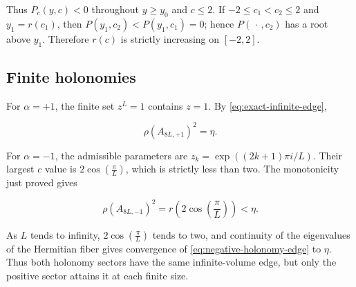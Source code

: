 Thus \(P_c(y,c)<0\) throughout \(y\geq y_{0}\) and \(c\leq 2\). If
\(-2\leq c_{1}<c_{2}\leq 2\) and \(y_{1}=r(c_{1})\), then
\(P(y_{1},c_{2})<P(y_{1},c_{1})=0\); hence \(P(\,\cdot\,,c_{2})\) has a root above \(y_{1}\).
Therefore \(r(c)\) is strictly increasing on \([-2,2]\).

\subsection{Finite holonomies}

For \(\alpha=+1\), the finite set \(z^L=1\) contains \(z=1\). By \eqref{eq:exact-infinite-edge},

\begin{equation}
\label{eq:positive-holonomy-edge}
\rho(A_{8L,+1})^{2}=\eta.
\end{equation}

For \(\alpha=-1\), the admissible parameters are
\(z_k=\exp((2k+1)\pi i/L)\). Their largest \(c\) value is \(2\cos(\frac{\pi}{L})\), which is
strictly less than two. The monotonicity just proved gives

\begin{equation}
\label{eq:negative-holonomy-edge}
\rho(A_{8L,-1})^{2}=r(2\cos(\frac{\pi}{L}))<\eta.
\end{equation}

As \(L\) tends to infinity, \(2\cos(\frac{\pi}{L})\) tends to two, and continuity of the
eigenvalues of the Hermitian fiber gives convergence of \eqref{eq:negative-holonomy-edge} to \(\eta\).
Thus both holonomy sectors have the same infinite-volume edge, but only the
positive sector attains it at each finite size.
